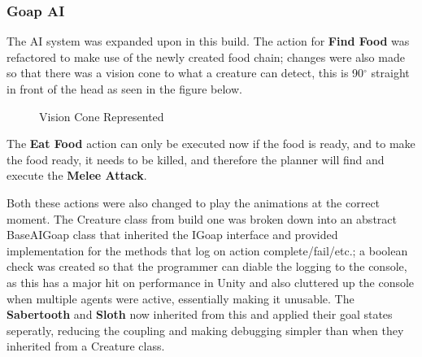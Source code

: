 \documentclass[12pt]{report}
\begin{document}
\subsubsection{Goap AI}
The AI system was expanded upon in this build. The action for \textbf{Find Food} was refactored to make use of the newly created food chain; changes were also made so that there was a vision cone to what a creature can detect, this is 90$^{\circ}$ straight in front of the head as seen in the figure below.
\begin{figure}[H]
    \centering
    \caption{Vision Cone Represented}
\end{figure}

The \textbf{Eat Food} action can only be executed now if the food is ready, and to make the food ready, it needs to be killed, and therefore the planner will find and execute the \textbf{Melee Attack}.

Both these actions were also changed to play the animations at the correct moment.
The Creature class from build one was broken down into an abstract BaseAIGoap class that inherited the IGoap interface and provided implementation for the methods that log on action complete/fail/etc.; a boolean check was created so that the programmer can diable the logging to the console, as this has a major hit on performance in Unity and also cluttered up the console when multiple agents were active, essentially making it unusable. The \textbf{Sabertooth} and \textbf{Sloth} now inherited from this and applied their goal states seperatly, reducing the coupling and making debugging simpler than when they inherited from a Creature class.
\end{document}
